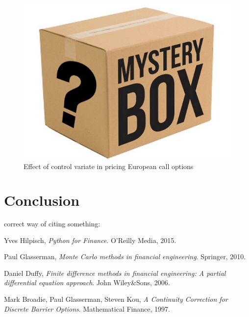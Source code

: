 \begin{figure}[h]
      \centering
	\includegraphics[scale=0.45]{DefaultItem.png}
      \caption{Effect of control variate in pricing European call options}
\end{figure}
\newpage

\section{Conclusion}

correct way of citing something: \cite{PythonForFinance}

\newpage
\begin{thebibliography}{9}
Yves Hilpisch,
\textit{Python for Finance}. 
O'Reilly Media, 2015.
 
Paul Glasserman,
\textit{Monte Carlo methods in financial engineering}.
Springer, 2010.

Daniel Duffy,
\textit{Finite difference methods in financial engineering: A partial differential equation approach}.
John Wiley\&Sons, 2006.

Mark Broadie, Paul Glasserman, Steven Kou,
\textit{A Continuity Correction for Discrete Barrier Options}.
Mathematical Finance, 1997.

\end{thebibliography}
